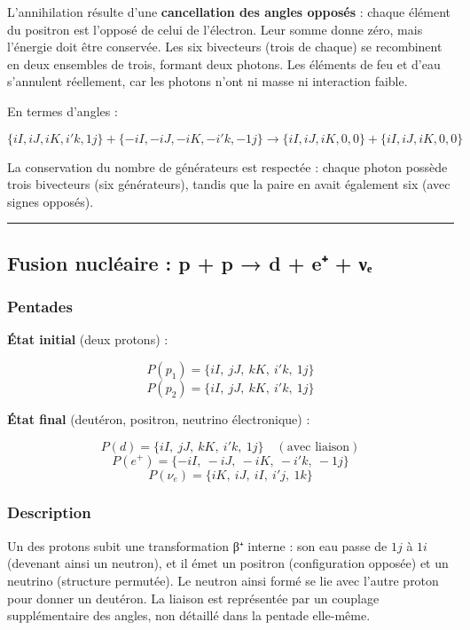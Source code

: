 \documentclass[11pt]{article}
\begin{document}
L'annihilation résulte d'une \textbf{cancellation des angles opposés} :
chaque élément du positron est l'opposé de celui de l'électron. Leur
somme donne zéro, mais l'énergie doit être conservée. Les six bivecteurs
(trois de chaque) se recombinent en deux ensembles de trois, formant
deux photons. Les éléments de feu et d'eau s'annulent réellement, car
les photons n'ont ni masse ni interaction faible.

En termes d'angles :

\[
\{iI,iJ,iK,i'k,1j\} + \{-iI,-iJ,-iK,-i'k,-1j\} \to \{iI,iJ,iK,0,0\} + \{iI,iJ,iK,0,0\}
\]

La conservation du nombre de générateurs est respectée : chaque photon
possède trois bivecteurs (six générateurs), tandis que la paire en avait
également six (avec signes opposés).

\begin{center}\rule{0.5\linewidth}{0.5pt}\end{center}

\hypertarget{fusion-nucluxe9aire-p-p-d-e-ux3bdux2091}{%
\subsection{Fusion nucléaire : p + p → d + e⁺ +
νₑ}\label{fusion-nucluxe9aire-p-p-d-e-ux3bdux2091}}

\hypertarget{pentades}{%
\subsubsection{Pentades}\label{pentades}}

\textbf{État initial} (deux protons) :

\[
P(p_1) = \{ iI,\ jJ,\ kK,\ i'k,\ 1j \}
\] \[
P(p_2) = \{ iI,\ jJ,\ kK,\ i'k,\ 1j \}
\]

\textbf{État final} (deutéron, positron, neutrino électronique) :

\[
P(d) = \{ iI,\ jJ,\ kK,\ i'k,\ 1j \} \quad (\text{avec liaison})
\] \[
P(e^+) = \{ -iI,\ -iJ,\ -iK,\ -i'k,\ -1j \}
\] \[
P(\nu_e) = \{ iK,\ iJ,\ iI,\ i'j,\ 1k \}
\]

\hypertarget{description}{%
\subsubsection{Description}\label{description}}

Un des protons subit une transformation β⁺ interne : son eau passe de
\(1j\) à \(1i\) (devenant ainsi un neutron), et il émet un positron
(configuration opposée) et un neutrino (structure permutée). Le neutron
ainsi formé se lie avec l'autre proton pour donner un deutéron. La
liaison est représentée par un couplage supplémentaire des angles, non
détaillé dans la pentade elle-même.
\end{document}
